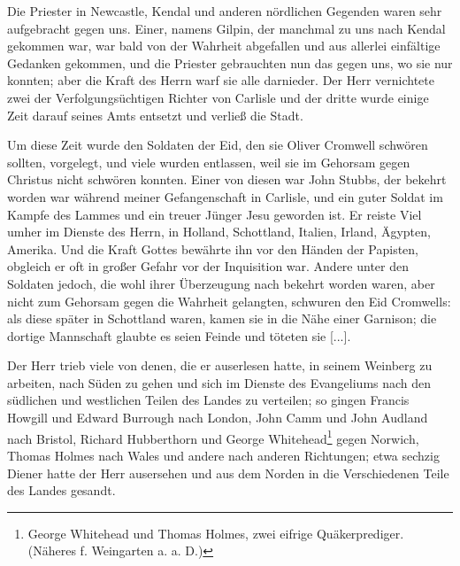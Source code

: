 Die Priester in Newcastle, Kendal und anderen nördlichen
Gegenden waren sehr aufgebracht gegen uns. Einer, namens
Gilpin, der manchmal zu uns nach Kendal gekommen war, war
bald von der Wahrheit abgefallen und aus allerlei einfältige
Gedanken gekommen, und die Priester gebrauchten nun das gegen
uns, wo sie nur konnten; aber die Kraft des Herrn warf sie
alle darnieder. Der Herr vernichtete zwei der Verfolgungsüchtigen
Richter von Carlisle und der dritte wurde einige Zeit darauf
seines Amts entsetzt und verließ die Stadt.


Um diese Zeit wurde den Soldaten der Eid, den sie Oliver
Cromwell schwören sollten, 
vorgelegt, und viele wurden entlassen,
weil sie im Gehorsam gegen Christus nicht schwören konnten.
Einer von diesen war John Stubbs, 
der bekehrt worden war
während meiner Gefangenschaft in Carlisle, und ein guter Soldat
im Kampfe des Lammes und ein treuer Jünger Jesu geworden
ist. Er reiste Viel umher im Dienste des Herrn, in Holland,
Schottland, Italien, 
Irland, Ägypten, 
Amerika. Und die Kraft
Gottes bewährte ihn vor den Händen der 
Papisten, obgleich er
oft in großer Gefahr vor der Inquisition 
war. Andere unter
den Soldaten jedoch, die wohl ihrer 
Überzeugung nach bekehrt
worden waren, aber nicht zum Gehorsam gegen die Wahrheit 
gelangten, schwuren den Eid Cromwells: als diese später in 
Schottland waren, kamen sie in die Nähe einer Garnison; die dortige
Mannschaft glaubte es seien Feinde und töteten sie [...].


Der Herr trieb viele von denen, die er auserlesen hatte, in
seinem Weinberg zu arbeiten, nach Süden zu gehen und sich im
Dienste des Evangeliums nach den südlichen und westlichen Teilen
des Landes zu verteilen; so gingen Francis 
Howgill und Edward
Burrough nach London, 
John Camm und John 
Audland nach
Bristol, Richard 
Hubberthorn und George 
Whitehead\footnote{George Whitehead 
und Thomas Holmes, zwei eifrige Quäkerprediger.
(Näheres f. Weingarten a. a. D.)} gegen
Norwich, Thomas Holmes nach 
Wales und andere nach anderen
Richtungen; etwa sechzig Diener hatte der Herr ausersehen und
aus dem Norden in die Verschiedenen Teile des Landes gesandt.

